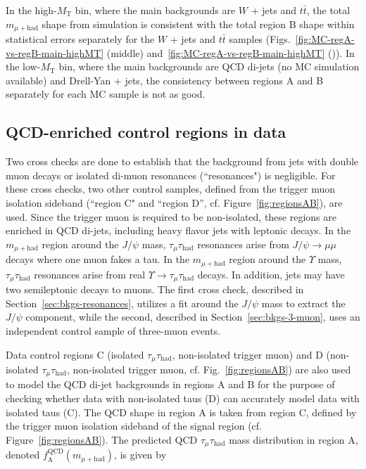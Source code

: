 In the high-$M_{\text{T}}$ bin, where the main backgrounds are $W$ + jets and $t\bar{t}$, the total $m_{\mu+\text{had}}$ shape from simulation is consistent with the total region B shape within statistical errors separately for the $W$ + jets and $t\bar{t}$ samples (Figs.~\ref{fig:MC-regA-vs-regB-main-highMT} (middle) and~\ref{fig:MC-regA-vs-regB-main-highMT} (\cmsRight)).  In the low-$M_{\text{T}}$ bin, where the main backgrounds are QCD di-jets (no MC simulation available) and Drell-Yan + jets, the consistency between regions A and B separately for each MC sample is not as good.

\subsection{QCD-enriched control regions in data\label{sec:bkgs-qcd-control}}

Two cross checks are done to establish that the background from jets with double muon decays or isolated di-muon resonances (``resonances") is negligible.  For these cross checks, two other control samples, defined from the trigger muon isolation sideband (``region C" and ``region D'', cf. Figure~\ref{fig:regionsAB}), are used.  Since the trigger muon is required to be non-isolated, these regions are enriched in QCD di-jets, including heavy flavor jets with leptonic decays.  In the $m_{\mu+\text{had}}$ region around the $J\slash\psi$ mass, $\tau_{\mu}\tau_{\text{had}}$ resonances arise from $J\slash\psi\rightarrow\mu\mu$ decays where one muon fakes a tau.  In the $m_{\mu+\text{had}}$ region around the $\Upsilon$ mass, $\tau_{\mu}\tau_{\text{had}}$ resonances arise from real $\Upsilon\rightarrow\tau_{\mu}\tau_{\text{had}}$ decays.  In addition, jets may have two semileptonic decays to muons.  The first cross check, described in Section~\ref{sec:bkgs-resonances}, utilizes a fit around the $J\slash\psi$ mass to extract the $J\slash\psi$ component, while the second, described in Section~\ref{sec:bkgs-3-muon}, uses an independent control sample of three-muon events.

Data control regions C (isolated $\tau_{\mu}\tau_{\text{had}}$, non-isolated trigger muon) and D (non-isolated $\tau_{\mu}\tau_{\text{had}}$, non-isolated trigger muon, cf. Fig.~\ref{fig:regionsAB}) are also used to model the QCD di-jet backgrounds in regions A and B for the purpose of checking whether data with non-isolated taus (D) can accurately model data with isolated taus (C). The QCD shape in region A is taken from region C, defined by the trigger muon isolation sideband of the signal region (cf. Figure~\ref{fig:regionsAB}).  The predicted QCD $\tau_{\mu}\tau_{\text{had}}$ mass distribution in region A, denoted $f_{\text{A}}^{\text{QCD}}(m_{\mu+\text{had}})$, is given by

